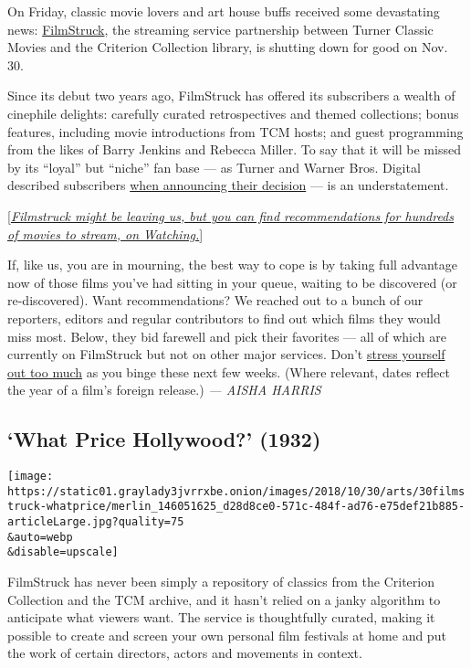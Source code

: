 On Friday, classic movie lovers and art house buffs received some
devastating news: \href{https://www.filmstruck.com/us/}{FilmStruck}, the
streaming service partnership between Turner Classic Movies and the
Criterion Collection library, is shutting down for good on Nov. 30.

Since its debut two years ago, FilmStruck has offered its subscribers a
wealth of cinephile delights: carefully curated retrospectives and
themed collections; bonus features, including movie introductions from
TCM hosts; and guest programming from the likes of Barry Jenkins and
Rebecca Miller. To say that it will be missed by its ``loyal'' but
``niche'' fan base --- as Turner and Warner Bros. Digital described
subscribers
\href{https://variety.com/2018/digital/news/filmstruck-shutdown-warnermedia-turner-1202998364/}{when
announcing their decision} --- is an understatement.

{[}\href{https://www.nytimes3xbfgragh.onion/watching}{\emph{Filmstruck
might be leaving us, but you can find recommendations for hundreds of
movies to stream, on Watching.}}{]}

If, like us, you are in mourning, the best way to cope is by taking full
advantage now of those films you've had sitting in your queue, waiting
to be discovered (or re-discovered). Want recommendations? We reached
out to a bunch of our reporters, editors and regular contributors to
find out which films they would miss most. Below, they bid farewell and
pick their favorites --- all of which are currently on FilmStruck but
not on other major services. Don't
\href{https://twitter.com/aliciamalone/status/1056955367878348800}{stress
yourself out too much} as you binge these next few weeks. (Where
relevant, dates reflect the year of a film's foreign release.) \emph{---
AISHA HARRIS}

\hypertarget{what-price-hollywood-1932}{%
\subsection{`What Price Hollywood?'
(1932)}\label{what-price-hollywood-1932}}

\texttt{[image: https://static01.graylady3jvrrxbe.onion/images/2018/10/30/arts/30filmstruck-whatprice/merlin\_146051625\_d28d8ce0-571c-484f-ad76-e75def21b885-articleLarge.jpg?quality=75\\\&auto=webp\\\&disable=upscale]}

FilmStruck has never been simply a repository of classics from the
Criterion Collection and the TCM archive, and it hasn't relied on a
janky algorithm to anticipate what viewers want. The service is
thoughtfully curated, making it possible to create and screen your own
personal film festivals at home and put the work of certain directors,
actors and movements in context.

